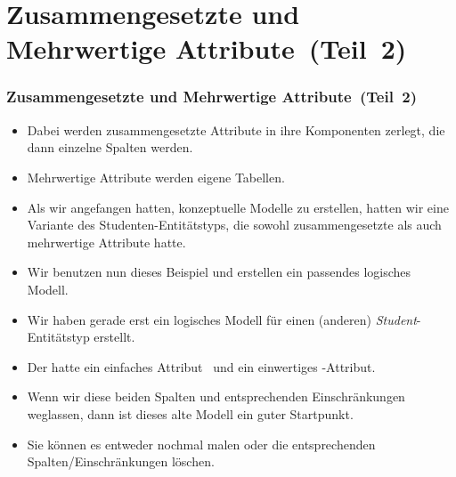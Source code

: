 \documentclass[aspectratio=169,mathserif,notheorems]{beamer}%
\begin{document}
\section{Zusammengesetzte und Mehrwertige Attribute~(Teil~2)}%
%
\begin{frame}[t]%
\frametitle{Zusammengesetzte und Mehrwertige Attribute~(Teil~2)}%
\begin{itemize}%
%
\item<2-> Dabei werden zusammengesetzte Attribute in ihre Komponenten zerlegt, die dann einzelne Spalten werden.%
\item<3-> Mehrwertige Attribute werden eigene Tabellen.%
\item<4-> Als wir angefangen hatten, konzeptuelle Modelle zu erstellen, hatten wir eine Variante des Studenten-Entitätstyps, die sowohl zusammengesetzte als auch mehrwertige Attribute hatte.%
\item<5-> Wir benutzen nun dieses Beispiel und erstellen ein passendes logisches Modell.%
\item<6-> Wir haben gerade erst ein logisches Modell für einen (anderen) \emph{Student}-Entitätstyp erstellt.%
\item<7-> Der hatte ein einfaches Attribut~ und ein einwertiges -Attribut.%
\item<8-> Wenn wir diese beiden Spalten und entsprechenden Einschränkungen weglassen, dann ist dieses alte Modell ein guter Startpunkt.%
\item<9-> Sie können es entweder nochmal malen oder die entsprechenden Spalten/Einschränkungen löschen.
\end{itemize}%
%
\end{frame}%
%
\end{document}
